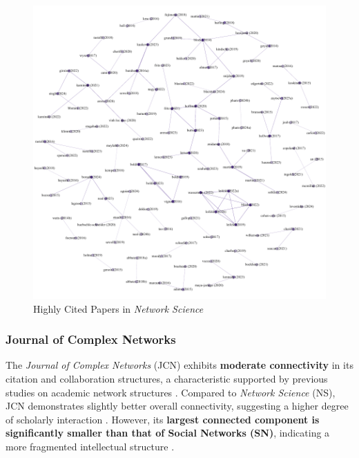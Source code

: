 \documentclass[twocolumn]{article}
\begin{document}
	\begin{figure}[htbp]
		\centering
		\includegraphics[width=\columnwidth]{"Network Science/Gephi/highly_cited.pdf"}
		\caption{Highly Cited Papers in \textit{Network Science}}
		\label{fig.fig5}
	\end{figure}
	
	\subsubsection*{Journal of Complex Networks}
	
	The \textit{Journal of Complex Networks} (JCN) exhibits \textbf{moderate connectivity} in its citation and collaboration structures, a characteristic supported by previous studies on academic network structures \cite{newman2001scientific, Liu2005}. Compared to \textit{Network Science} (NS), JCN demonstrates slightly better overall connectivity, suggesting a higher degree of scholarly interaction \cite{Barabasi2002}. However, its \textbf{largest connected component is significantly smaller than that of Social Networks (SN)}, indicating a more fragmented intellectual structure \cite{Otte2002, Borgatti2009}.
	
\end{document}
